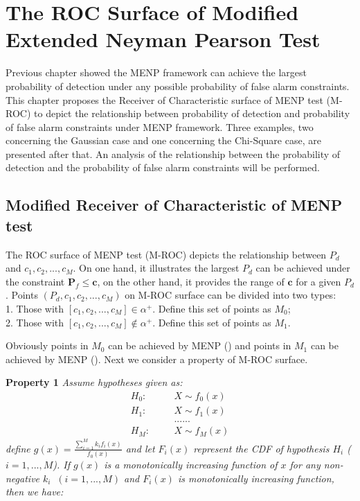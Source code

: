 \chapter{The ROC Surface of Modified Extended Neyman Pearson Test}
Previous chapter showed the MENP framework can achieve the largest probability of detection under any possible probability of false alarm constraints. This chapter proposes the Receiver of Characteristic surface of MENP test (M-ROC) to depict the relationship between probability of detection and probability of false alarm constraints under MENP framework. Three examples,  two concerning the Gaussian case and one concerning the Chi-Square case, are presented after that. An analysis of the relationship between the probability of detection and the probability of false alarm constraints will be performed. 

\section{Modified Receiver of Characteristic of MENP test}

The ROC surface of MENP test (M-ROC) depicts the relationship between $P_d$ and $c_1, c_2, ..., c_M$. On one hand, it  illustrates the largest $P_d$ can be achieved under the constraint $\mathbf{P}_{f} \leq \mathbf{c}$, on the other hand, it provides the range of $\mathbf{c}$ for a given $P_d$.
Points $(P_d, c_1, c_2, ..., c_M)$ on M-ROC  surface can be divided into two types: 
\\1. Those with $[c_1, c_2, ..., c_M] \in \alpha^+$. Define this set of points as $M_0$; 
\\2. Those with $[c_1, c_2, ..., c_M] \notin \alpha^+$. Define this set of points as $M_1$. 

Obviously points in $M_0$ can be achieved by MENP () and points in $M_1$ can  be achieved by MENP (). Next we consider a property of M-ROC surface.

\noindent \textbf{Property 1}
\noindent \textit{
  \noindent Assume hypotheses given as:
}
\begin{equation}
  \begin{split}
	H_0:\;\;\;\;\;\;&X \sim f_0(x)\\
	H_1:\;\;\;\;\;\;&X \sim f_1(x)\\
	&......\\
	H_M:\;\;\;\;\;\;&X \sim f_M(x)
  \end{split}
\end{equation}
\textit{
  define $g(x) = \frac{\sum_{i=1}^{M}k_if_i(x)}{f_0(x)}$ and let $F_i(x)$ represent the CDF of hypothesis $H_i$ ($i = 1, ..., M$). If $g(x)$ is a monotonically increasing function of $x$ for any non-negative $k_i\;\;(i = 1, ..., M)$ and $F_i(x)$ is monotonically increasing function, then we have:}


